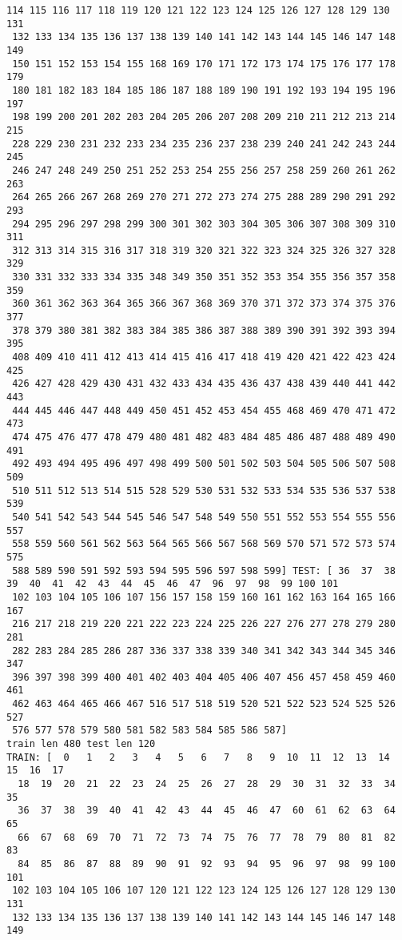 \documentclass[11pt]{article}
\begin{document}
\begin{Verbatim}[commandchars=\\\{\}]
 114 115 116 117 118 119 120 121 122 123 124 125 126 127 128 129 130 131
 132 133 134 135 136 137 138 139 140 141 142 143 144 145 146 147 148 149
 150 151 152 153 154 155 168 169 170 171 172 173 174 175 176 177 178 179
 180 181 182 183 184 185 186 187 188 189 190 191 192 193 194 195 196 197
 198 199 200 201 202 203 204 205 206 207 208 209 210 211 212 213 214 215
 228 229 230 231 232 233 234 235 236 237 238 239 240 241 242 243 244 245
 246 247 248 249 250 251 252 253 254 255 256 257 258 259 260 261 262 263
 264 265 266 267 268 269 270 271 272 273 274 275 288 289 290 291 292 293
 294 295 296 297 298 299 300 301 302 303 304 305 306 307 308 309 310 311
 312 313 314 315 316 317 318 319 320 321 322 323 324 325 326 327 328 329
 330 331 332 333 334 335 348 349 350 351 352 353 354 355 356 357 358 359
 360 361 362 363 364 365 366 367 368 369 370 371 372 373 374 375 376 377
 378 379 380 381 382 383 384 385 386 387 388 389 390 391 392 393 394 395
 408 409 410 411 412 413 414 415 416 417 418 419 420 421 422 423 424 425
 426 427 428 429 430 431 432 433 434 435 436 437 438 439 440 441 442 443
 444 445 446 447 448 449 450 451 452 453 454 455 468 469 470 471 472 473
 474 475 476 477 478 479 480 481 482 483 484 485 486 487 488 489 490 491
 492 493 494 495 496 497 498 499 500 501 502 503 504 505 506 507 508 509
 510 511 512 513 514 515 528 529 530 531 532 533 534 535 536 537 538 539
 540 541 542 543 544 545 546 547 548 549 550 551 552 553 554 555 556 557
 558 559 560 561 562 563 564 565 566 567 568 569 570 571 572 573 574 575
 588 589 590 591 592 593 594 595 596 597 598 599] TEST: [ 36  37  38  39  40  41  42  43  44  45  46  47  96  97  98  99 100 101
 102 103 104 105 106 107 156 157 158 159 160 161 162 163 164 165 166 167
 216 217 218 219 220 221 222 223 224 225 226 227 276 277 278 279 280 281
 282 283 284 285 286 287 336 337 338 339 340 341 342 343 344 345 346 347
 396 397 398 399 400 401 402 403 404 405 406 407 456 457 458 459 460 461
 462 463 464 465 466 467 516 517 518 519 520 521 522 523 524 525 526 527
 576 577 578 579 580 581 582 583 584 585 586 587]
train len 480 test len 120
TRAIN: [  0   1   2   3   4   5   6   7   8   9  10  11  12  13  14  15  16  17
  18  19  20  21  22  23  24  25  26  27  28  29  30  31  32  33  34  35
  36  37  38  39  40  41  42  43  44  45  46  47  60  61  62  63  64  65
  66  67  68  69  70  71  72  73  74  75  76  77  78  79  80  81  82  83
  84  85  86  87  88  89  90  91  92  93  94  95  96  97  98  99 100 101
 102 103 104 105 106 107 120 121 122 123 124 125 126 127 128 129 130 131
 132 133 134 135 136 137 138 139 140 141 142 143 144 145 146 147 148 149

\end{Verbatim}
\end{document}

